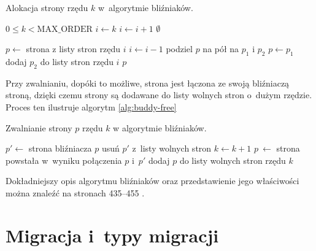 \begin{algorithm}
\caption[Alokacja strony w~algorytmie bliźniaków.]{Alokacja strony
  rzędu $k$ w~algorytmie bliźniaków.}
\label{alg:buddy-alloc}
\begin{algorithmic}[1]
\Require $0 \leq k < \mathrm{MAX\_ORDER}$
    \State $i \gets k$
        \State $i \gets i + 1$
            \State \Return $\emptyset$
        \EndIf
    \EndWhile

    \State $p \gets$ strona z listy stron rzędu $i$
        \State $i \gets i - 1$
        \State podziel $p$ na pół na $p_1$ i $p_2$
        \State $p \gets p_1$
        \State dodaj $p_2$ do listy stron rzędu $i$
    \EndWhile
    \State \Return $p$
\EndFunction
\end{algorithmic}
\end{algorithm}

Przy zwalnianiu, dopóki to możliwe, strona jest łączona ze swoją
bliźniaczą stroną, dzięki czemu strony są dodawane do listy wolnych
stron o~dużym rzędzie.  Proces ten ilustruje algorytm
\ref{alg:buddy-free}

\begin{algorithm}
\caption[Zwalnianie strony w~algorytmie bliźniaków.]{Zwalnianie strony
  $p$ rzędu $k$ w algorytmie bliźniaków.}
\label{alg:buddy-free}
\begin{algorithmic}[1]
        \State $p' \gets$ strona bliźniacza $p$
        \State usuń $p'$ z~listy wolnych stron
        \State $k \gets k + 1$
        \State $p~\gets$ strona powstała w~wyniku połączenia $p$ i~$p'$ \label{alg:buddy-free:join}
    \EndWhile
    \State dodaj $p$ do listy wolnych stron rzędu $k$ \label{alg:buddy-free:add}
\EndProcedure
\end{algorithmic}
\end{algorithm}

Dokładniejszy opis algorytmu bliźniaków oraz przedstawienie jego
właściwości można znaleźć na stronach 435--455 \cite{bib:taocp-fa}.


\section{Migracja i~typy migracji}\label{sec:migratetype}

